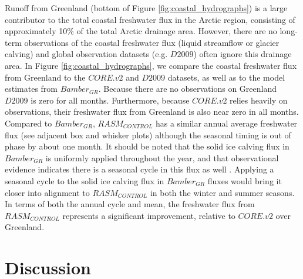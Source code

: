 \documentclass[jgrga, draft]{agutex}
\begin{document}
\begin{article}
Runoff from Greenland (bottom of Figure \ref{fig:coastal_hydrographs}) is a large contributor to the total coastal freshwater flux in the Arctic region, consisting of approximately 10\% of the total Arctic drainage area.
However, there are no long-term observations of the coastal freshwater flux (liquid streamflow or glacier calving) and global observation datasets (e.g. $D2009$) often ignore this drainage area.
In Figure \ref{fig:coastal_hydrographs}, we compare the coastal freshwater flux from Greenland to the $CORE.v2$ and $D2009$ datasets, as well as to the model estimates from $Bamber_{GR}$.
Because there are no observations on Greenland $D2009$ is zero for all months.
Furthermore, because $CORE.v2$ relies heavily on observations, their freshwater flux from Greenland is also near zero in all months.
Compared to $Bamber_{GR}$, $RASM_{CONTROL}$ has a similar annual average freshwater flux (see adjacent box and whisker plots) although the seasonal timing is out of phase by about one month.
It should be noted that the solid ice calving flux in $Bamber_{GR}$ is uniformly applied throughout the year, and that observational evidence indicates there is a seasonal cycle in this flux as well \citep[e.g.][]{Joughin_2008}.
Applying a seasonal cycle to the solid ice calving flux in $Bamber_{GR}$ fluxes would bring it closer into alignment to $RASM_{CONTROL}$ in both the winter and summer seasons.
In terms of both the annual cycle and mean, the freshwater flux from $RASM_{CONTROL}$ represents a significant improvement, relative to $CORE.v2$ over Greenland.

\section{Discussion}
\label{sec:discussion}


\end{article}
\end{document}

